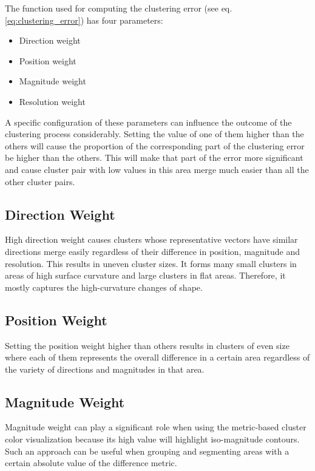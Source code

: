 The function used for computing the clustering error (see eq. \ref{eq:clustering_error}) has four parameters:

\begin{itemize}
\item Direction weight
\item Position weight
\item Magnitude weight
\item Resolution weight
\end{itemize}

A specific configuration of these parameters can influence the outcome of the clustering process considerably. Setting the value of one of them higher than the others will cause the proportion of the corresponding part of the clustering error be higher than the others. This will make that part of the error more significant and cause cluster pair with low values in this area merge much easier than all the other cluster pairs.

\subsection{Direction Weight}

High direction weight causes clusters whose representative vectors have similar directions merge easily regardless of their difference in position, magnitude and resolution. This results in uneven cluster sizes. It forms many small clusters in areas of high surface curvature and large clusters in flat areas. Therefore, it mostly captures the high-curvature changes of shape.
\subsection{Position Weight}

Setting the position weight higher than others results in clusters of even size where each of them represents the overall difference in a certain area regardless of the variety of directions and magnitudes in that area.
\subsection{Magnitude Weight}

Magnitude weight can play a significant role when using the metric-based cluster color visualization because its high value will highlight iso-magnitude contours. Such an approach can be useful when grouping and segmenting areas with a certain absolute value of the difference metric.
